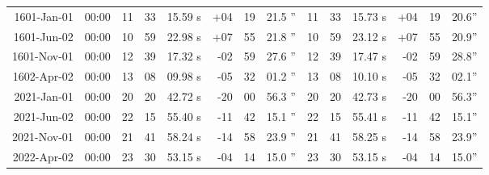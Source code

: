 \begin{longtable}{r@{\,}r|r@{h\,}r@{m\,}r<{s}|r@{°\,}r@{'\,}r<{''}||r@{h\,}r@{m\,}r<{s}|r@{°\,}r@{'\,}r<{''}}
 1601-Jan-01 & 00:00  &   11 & 33 & 15.59 & +04 & 19 & 21.5 & 11&33&15.73 & +04&19&20.6\\ %
 1601-Jun-02 & 00:00  &   10 & 59 & 22.98 & +07 & 55 & 21.8 & 10&59&23.12 & +07&55&20.9\\ %
 1601-Nov-01 & 00:00  &   12 & 39 & 17.32 & -02 & 59 & 27.6 & 12&39&17.47 & -02&59&28.8\\ %
 1602-Apr-02 & 00:00  &   13 & 08 & 09.98 & -05 & 32 & 01.2 & 13&08&10.10 & -05&32&02.1\\ %
 2021-Jan-01 & 00:00  &   20 & 20 & 42.72 & -20 & 00 & 56.3 & 20&20&42.73 & -20&00&56.3\\ %
 2021-Jun-02 & 00:00  &   22 & 15 & 55.40 & -11 & 42 & 15.1 & 22&15&55.41 & -11&42&15.1\\ %
 2021-Nov-01 & 00:00  &   21 & 41 & 58.24 & -14 & 58 & 23.9 & 21&41&58.25 & -14&58&23.9\\ %
 2022-Apr-02 & 00:00  &   23 & 30 & 53.15 & -04 & 14 & 15.0 & 23&30&53.15 & -04&14&15.0\\ %

\end{longtable}

